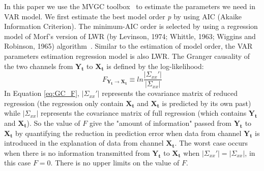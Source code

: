 In this paper we use the MVGC toolbox~\cite{barnett2014mvgc} to estimate the parameters we need in VAR model. We first estimate the best model order \emph{p} by using AIC (Akaike Information Criterion). The minimum-AIC order is selected by using a regression model of Morf's version of LWR (by Levinson, 1974; Whittle, 1963; Wiggins and Robinson, 1965) algorithm~\cite{morf1978recursive}. Similar to the estimation of model order, the VAR parameters estimation regression model is also LWR. The Granger causality of the two channels from $\mathbf{Y_t}$ to $\mathbf{X_t}$ is defined by the log-likelihood:
\begin{equation} \label{eq:GC_F}
F_{\mathbf{Y_t}\rightarrow \mathbf{X_t}} \equiv ln \frac{|\Sigma_{xx}'|}{|\Sigma_{xx}|}
\end{equation}
In Equation \ref{eq:GC_F}, $|\Sigma_{xx}'|$ represents the covariance matrix of reduced regression (the regression only contain $\mathbf{X_t}$ and $\mathbf{X_t}$ is predicted by its own past) while $|\Sigma_{xx}|$ represents the covariance matrix of full regression (which contains $\mathbf{Y_t}$ and $\mathbf{X_t}$). So the value of $F$ give the "amount of information" passed from $\mathbf{Y_t}$ to $\mathbf{X_t}$ by quantifying the reduction in prediction error when data from channel $\mathbf{Y_t}$ is introduced in the explanation of data from channel $\mathbf{X_t}$. The worst case occurs when there is no information transmitted from $\mathbf{Y_t}$ to $\mathbf{X_t}$ when $|\Sigma_{xx}'|=|\Sigma_{xx}|$, in this case $F=0$. There is no upper limits on the value of $F$.

